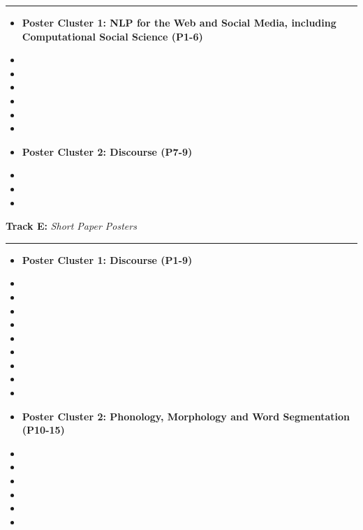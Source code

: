\noindent \rule[0.5ex]{1\columnwidth}{1pt}
\begin{itemize}
\item []\textbf{Poster Cluster 1: NLP for the Web and Social Media, including Computational Social Science (P1-6)}
\item {}
\item {}
\item {}
\item {}
\item {}
\item {}
\item []\textbf{Poster Cluster 2: Discourse (P7-9)}
\item {}
\item {}
\item {}
\end{itemize}

\bigskip{}
\noindent \textbf{Track E:} \emph{Short Paper Posters} \hfill \emph{}\smallskip{}

\noindent \rule[0.5ex]{1\columnwidth}{1pt}
\begin{itemize}
\item []\textbf{Poster Cluster 1: Discourse (P1-9)}
\item {}
\item {}
\item {}
\item {}
\item {}
\item {}
\item {}
\item {}
\item {}
\item []\textbf{Poster Cluster 2: Phonology, Morphology and Word Segmentation (P10-15)}
\item {}
\item {}
\item {}
\item {}
\item {}
\item {}
\end{itemize}

\clearpage
